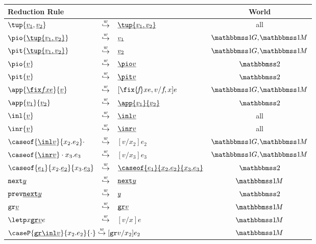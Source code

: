 \begin{figure}[t]
\begin{abstrsyn}
\begin{tabular}{| l c l | c |} 
\hline Reduction Rule &&& World \\ \hline 
$\tup{\exv {v_1},\exv {v_2}}$ 						& $\overset{w}\hookrightarrow$ & $\exv{\tup{v_1,v_2}}$ 					& all \\
$\pio {\exv{\tup{v_1,v_2}}}$ 						& $\overset{w}\hookrightarrow$ & $\underline{\smash{v_1}}$ 							& $\bbonep,\hspace{-0.1em}\bbonem$ \\
$\pit {\exv{\tup{v_1,v_2}}}$ 						& $\overset{w}\hookrightarrow$ & $\underline{\smash{v_2}}$ 							& $\bbonep,\hspace{-0.1em}\bbonem$ \\
$\pio{\exv v}$ 										& $\overset{w}\hookrightarrow$ & $\exv{\pio v}$ 						& $\bbtwo$ \\
$\pit{\exv v}$ 										& $\overset{w}\hookrightarrow$ & $\exv{\pit v}$ 						& $\bbtwo$ \\
$\app {\exv{\fix fxe}}{\exv v}$ 					& $\overset{w}\hookrightarrow$ & $[\fix {\!f\!}xe,v/f\!,x]e$ 			& $\bbonep,\hspace{-0.1em}\bbonem$ \\
$\app{\exv {v_1}}{\exv {v_2}}$ 						& $\overset{w}\hookrightarrow$ & $\exv{\app{v_1}{v_2}}$ 				& $\bbtwo$ \\
$\inl{\exv v}$ 										& $\overset{w}\hookrightarrow$ & $\exv{\inl v}$ 						& all \\
$\inr{\exv v}$ 										& $\overset{w}\hookrightarrow$ & $\exv{\inr v}$ 						& all \\
$\caseof {\exv{\inl v}}{x_2.e_2}\cdot$\hspace{-1em}	& $\overset{w}\hookrightarrow$ & $[v/x_2]e_2$ 							& $\bbonep,\hspace{-0.1em}\bbonem$ \\
$\caseof {\exv{\inr v}}\cdot{x_3.e_3}$\hspace{-1em}	& $\overset{w}\hookrightarrow$ & $[v/x_3]e_3$ 							& $\bbonep,\hspace{-0.1em}\bbonem$ \\
$\caseof {\exv{e_1}}{x_2.\exv{e_2}}{x_3.\exv{e_3}}$ & $\overset{w}\hookrightarrow$ & $\exv{\caseof{e_1}{x_2.e_2}{x_3.e_3}}$ & $\bbtwo$ \\
${\tt next}{\underline{\smash{y}}}$ 									& $\overset{w}\hookrightarrow$ & $\underline{\smash{{\tt next} y}}$ 						& $\bbonem$ \\
${\tt prev} {\underline{\smash{{\tt next} y}}}$ 							& $\overset{w}\hookrightarrow$ & $\underline{\smash{y}}$ 								& $\bbtwo$ \\
${\tt gr}{\underline{\smash{v}}}$ 									& $\overset{w}\hookrightarrow$ & $\underline{\smash{{\tt gr} v}}$ 						& $\bbonem$ \\
$\letp x {\exv {\pure v}} e$ 						& $\overset{w}\hookrightarrow$ & $[v/x]e$ 								& $\bbonem$ \\
\multicolumn{3}{|l|}{$\caseP {\exv{\pure{\inl v}}}{x_2.e_2}{\cdot} \stepsym w [\pure v/x_2]e_2$} 			& $\bbonem$ \\

\end{tabular}
\end{abstrsyn}
\end{figure}
